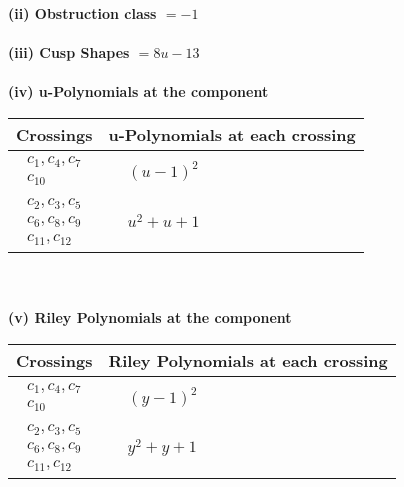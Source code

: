 \documentclass[1p]{elsarticle_modified}
\theoremstyle{definition}
\begin{document}
\flushleft \textbf{(ii) Obstruction class $= -1$}\\~\\
\flushleft \textbf{(iii) Cusp Shapes $= 8 u-13$}\\~\\
\newpage\renewcommand{\arraystretch}{1}
\flushleft \textbf{(iv) u-Polynomials at the component}\newline \\
\begin{tabular}{m{50pt}|m{274pt}}
Crossings & \hspace{64pt}u-Polynomials at each crossing \\
\hline $$\begin{aligned}c_{1},c_{4},c_{7}\\c_{10}\end{aligned}$$&$\begin{aligned}
&(u-1)^2
\end{aligned}$\\
\hline $$\begin{aligned}c_{2},c_{3},c_{5}\\c_{6},c_{8},c_{9}\\c_{11},c_{12}\end{aligned}$$&$\begin{aligned}
&u^2+u+1
\end{aligned}$\\
\hline
\end{tabular}\\~\\
\newpage\renewcommand{\arraystretch}{1}
\flushleft \textbf{(v) Riley Polynomials at the component}\newline \\
\begin{tabular}{m{50pt}|m{274pt}}
Crossings & \hspace{64pt}Riley Polynomials at each crossing \\
\hline $$\begin{aligned}c_{1},c_{4},c_{7}\\c_{10}\end{aligned}$$&$\begin{aligned}
&(y-1)^2
\end{aligned}$\\
\hline $$\begin{aligned}c_{2},c_{3},c_{5}\\c_{6},c_{8},c_{9}\\c_{11},c_{12}\end{aligned}$$&$\begin{aligned}
&y^2+y+1
\end{aligned}$\\
\hline
\end{tabular}\\~\\
\end{document}
